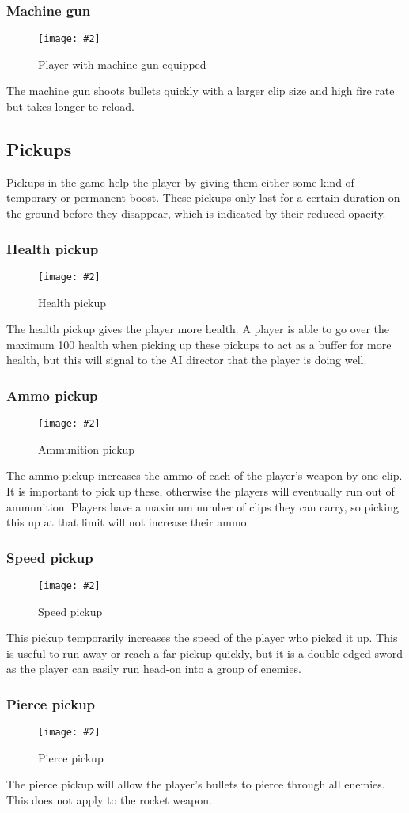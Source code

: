 \documentclass{article}
\newcommand{\figimg}[3]{
  \begin{figure}[H]
    \centering
    \texttt{[image: \#2]}
    \caption{#3}
  \end{figure}
  \noindent 
}
\begin{document}
\subsubsection{Machine gun}
\figimg{0.1}{imgs/MachineGun.png}{Player with machine gun equipped}
The machine gun shoots bullets quickly with a larger clip size and high fire rate but takes longer to reload.


\subsection{Pickups}
Pickups in the game help the player by giving them either some kind of temporary or permanent boost. These pickups only last for a certain duration on the ground before they disappear, which is indicated by their reduced opacity.
\subsubsection{Health pickup}
\figimg{0.1}{imgs/HealthPickup.png}{Health pickup}
The health pickup gives the player more health. A player is able to go over the maximum 100 health when picking up these pickups to act as a buffer for more health, but this will signal to the AI director that the player is doing well.

\subsubsection{Ammo pickup}
\figimg{0.1}{imgs/AmmoPickup.png}{Ammunition pickup}
The ammo pickup increases the ammo of each of the player's weapon by one clip. It is important to pick up these, otherwise the players will eventually run out of ammunition. Players have a maximum number of clips they can carry, so picking this up at that limit will not increase their ammo.

\subsubsection{Speed pickup}
\figimg{0.1}{imgs/SpeedPickup.png}{Speed pickup}
This pickup temporarily increases the speed of the player who picked it up. This is useful to run away or reach a far pickup quickly, but it is a double-edged sword as the player can easily run head-on into a group of enemies.

\subsubsection{Pierce pickup}
\figimg{0.1}{imgs/PiercePickup.png}{Pierce pickup}
The pierce pickup will allow the player's bullets to pierce through all enemies. This does not apply to the rocket weapon.
\end{document}
